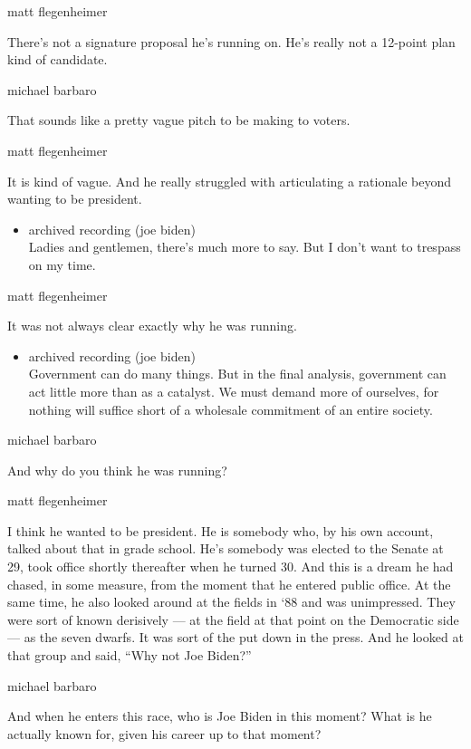 matt flegenheimer

There's not a signature proposal he's running on. He's really not a
12-point plan kind of candidate.

michael barbaro

That sounds like a pretty vague pitch to be making to voters.

matt flegenheimer

It is kind of vague. And he really struggled with articulating a
rationale beyond wanting to be president.

\begin{itemize}
\tightlist
\item
  archived recording (joe biden)\\
  Ladies and gentlemen, there's much more to say. But I don't want to
  trespass on my time.
\end{itemize}

matt flegenheimer

It was not always clear exactly why he was running.

\begin{itemize}
\tightlist
\item
  archived recording (joe biden)\\
  Government can do many things. But in the final analysis, government
  can act little more than as a catalyst. We must demand more of
  ourselves, for nothing will suffice short of a wholesale commitment of
  an entire society.
\end{itemize}

michael barbaro

And why do you think he was running?

matt flegenheimer

I think he wanted to be president. He is somebody who, by his own
account, talked about that in grade school. He's somebody was elected to
the Senate at 29, took office shortly thereafter when he turned 30. And
this is a dream he had chased, in some measure, from the moment that he
entered public office. At the same time, he also looked around at the
fields in `88 and was unimpressed. They were sort of known derisively
--- at the field at that point on the Democratic side --- as the seven
dwarfs. It was sort of the put down in the press. And he looked at that
group and said, ``Why not Joe Biden?''

michael barbaro

And when he enters this race, who is Joe Biden in this moment? What is
he actually known for, given his career up to that moment?

